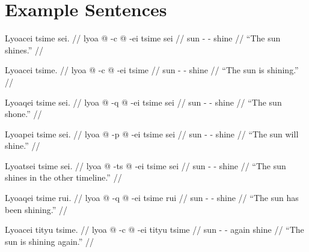 \documentclass{article}
\begin{document}






\newpage

\part{Example Sentences}

\ex[lingstyle=QuCheanya] \begingl
\glpreamble Lyoacei tsime sei. //
\gla lyoa @ -c @ -ei tsime sei //
\glb sun - - shine  //
\glft ``The sun shines.'' //
\endgl \xe

\ex[lingstyle=QuCheanya] \begingl
\glpreamble Lyoacei tsime. //
\gla lyoa @ -c @ -ei tsime //
\glb sun - - shine //
\glft ``The sun is shining.'' //
\endgl \xe

\ex[lingstyle=QuCheanya] \begingl
\glpreamble Lyoaqei tsime sei. //
\gla lyoa @ -q @ -ei tsime sei  //
\glb sun - - shine  //
\glft ``The sun shone.'' //
\endgl \xe

\ex[lingstyle=QuCheanya] \begingl
\glpreamble Lyoapei tsime sei. //
\gla lyoa @ -p @ -ei tsime sei //
\glb sun - - shine  //
\glft ``The sun will shine.'' //
\endgl \xe

\ex[lingstyle=QuCheanya] \begingl
\glpreamble Lyoatsei tsime sei. //
\gla lyoa @ -ts @ -ei tsime sei //
\glb sun - - shine  //
\glft ``The sun shines in the other timeline.'' //
\endgl \xe

\ex[lingstyle=QuCheanya] \begingl
\glpreamble Lyoaqei tsime rui. //
\gla lyoa @ -q @ -ei tsime rui //
\glb sun - - shine  //
\glft ``The sun has been shining.'' //
\endgl \xe

\ex[lingstyle=QuCheanya] \begingl
\glpreamble Lyoacei tityu tsime. //
\gla lyoa @ -c @ -ei tityu tsime //
\glb sun - - again shine //
\glft ``The sun is shining again.'' //
\endgl \xe
\end{document}
